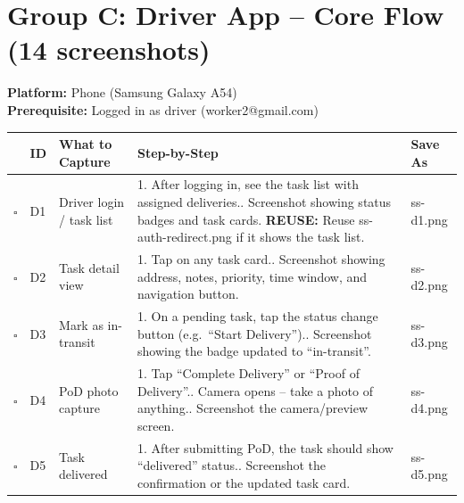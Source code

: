 \documentclass[11pt,a4paper]{article}
\newcommand{\checkbox}{$\square$\;}
\newcommand{\reuse}[1]{{\color{reuseorange}\textbf{REUSE:} #1}}
\newcommand{\filesave}[1]{{\ttfamily\small #1}}
\begin{document}
\section{Group C: Driver App -- Core Flow (14 screenshots)}

\textbf{Platform:} Phone (Samsung Galaxy A54) \\
\textbf{Prerequisite:} Logged in as driver (worker2@gmail.com)

\begin{longtable}{@{}p{0.4cm} p{0.6cm} p{2.5cm} p{5.5cm} p{3.0cm}@{}}
  \toprule
  & \textbf{ID} & \textbf{What to Capture} & \textbf{Step-by-Step} & \textbf{Save As} \\
  \midrule

  \checkbox & D1 & Driver login / task list &
    1. After logging in, see the task list with assigned deliveries.\newline
    2. Screenshot showing status badges and task cards.\newline
    \reuse{Reuse ss-auth-redirect.png if it shows the task list.} &
    \filesave{ss-d1.png} \\[6pt]

  \checkbox & D2 & Task detail view &
    1. Tap on any task card.\newline
    2. Screenshot showing address, notes, priority, time window, and navigation button. &
    \filesave{ss-d2.png} \\[6pt]

  \checkbox & D3 & Mark as in-transit &
    1. On a pending task, tap the status change button (e.g.\ ``Start Delivery'').\newline
    2. Screenshot showing the badge updated to ``in-transit''. &
    \filesave{ss-d3.png} \\[6pt]

  \checkbox & D4 & PoD photo capture &
    1. Tap ``Complete Delivery'' or ``Proof of Delivery''.\newline
    2. Camera opens -- take a photo of anything.\newline
    3. Screenshot the camera/preview screen. &
    \filesave{ss-d4.png} \\[6pt]

  \checkbox & D5 & Task delivered &
    1. After submitting PoD, the task should show ``delivered'' status.\newline
    2. Screenshot the confirmation or the updated task card. &
    \filesave{ss-d5.png} \\[6pt]


\end{longtable}
\end{document}
